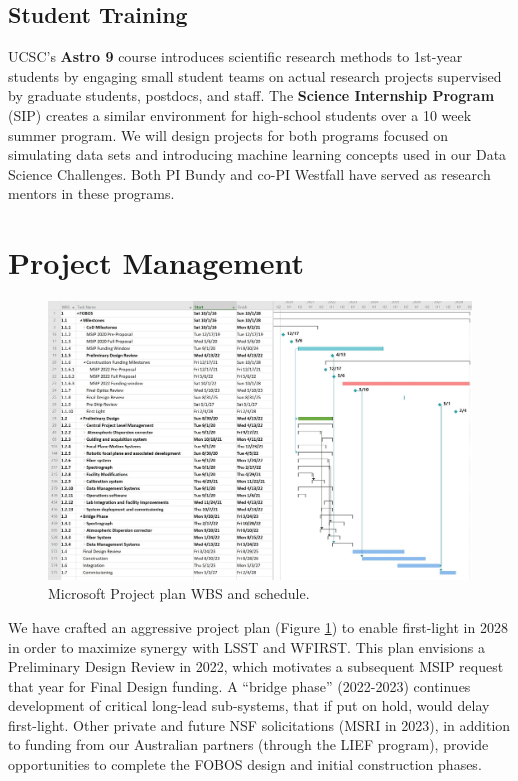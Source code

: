 \documentclass[oneside,11pt]{amsart}
\begin{document}
\subsection{Student Training} UCSC's {\bf Astro 9} course introduces
scientific research methods to 1st-year students by engaging small
student teams on actual research projects supervised by graduate
students, postdocs, and staff. The {\bf Science Internship Program}
(SIP) creates a similar environment for high-school students over a
10 week summer program. We will design projects for both programs
focused on simulating data sets and introducing machine learning
concepts used in our Data Science Challenges. Both PI Bundy and co-PI
Westfall have served as research mentors in these programs.

\section{Project Management}

\begin{figure}[h!]
%
\vskip -0.1in
%
\includegraphics[width=\textwidth]{figs/Pre-Proposal_Project_figure.jpg}
%
\caption{\small Microsoft Project plan WBS and schedule.}
%
\label{fig:gantt}
%
\end{figure}


We have crafted an aggressive project plan (Figure \ref{fig:gantt}) to enable first-light in 2028 in order to maximize
synergy with LSST and WFIRST.  This plan envisions a Preliminary Design Review in 2022, which motivates a subsequent
MSIP request that year for Final Design funding.  A ``bridge phase'' (2022-2023) continues development of critical
long-lead sub-systems, that if put on hold, would delay first-light.  Other private and future NSF solicitations (MSRI
in 2023), in addition to funding from our Australian partners (through the LIEF program), provide opportunities to
complete the FOBOS design and initial construction phases.
\end{document}
